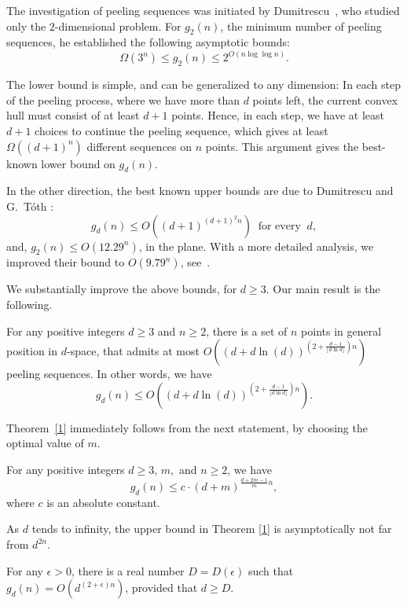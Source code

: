 \documentclass[a4paper,UKenglish,cleveref, autoref, thm-restate]{lipics-v2021}
\begin{document}
The investigation of peeling sequences was initiated by Dumitrescu~\cite{dum1}, who studied only the $2$-dimensional problem. For $g_2(n)$, the minimum number of peeling sequences, he established the following asymptotic bounds:
$$\Omega(3^n)\le g_2(n)\leq 2^{O(n\log{\log{n}})}.$$

 The lower bound is simple, and can be generalized to any dimension: In each step of the peeling process, where we have more than $d$ points left, the current convex hull must consist of at least $d+1$ points. Hence, in each step, we have at least $d+1$ choices to continue the peeling sequence, which gives at least $\Omega((d+1)^n)$ different sequences on $n$ points. This argument gives the best-known lower bound on $g_d(n)$.
 
 In the other direction, the best known upper bounds are due to Dumitrescu and G.~Tóth \cite{Dumitrescu}:  $$g_d(n)\leq O((d+1)^{(d+1)^2n})\;\; \mbox{for every}\;\; d,$$ and, $g_2(n)\leq O(12.29^n)$, in the plane. With a more detailed analysis, we improved their bound to $O(9.79^n)$, see~\cite{Si24}.

We substantially improve the above bounds, for $d\geq 3$. Our main result is the following. 

 \begin{theorem}\label{1}
 For any positive integers $d\geq3$ and $n\geq2$, there is a set of $n$ points in general position in $d$-space, that admits at most $O((d+d\ln{(d)})^{(2+\frac{d-1}{\lfloor d\ln{d}\rfloor})n})$ peeling sequences. In other words, we have
 $$g_d(n)\leq O((d+d\ln{(d)})^{(2+\frac{d-1}{\lfloor d\ln{d}\rfloor})n}).$$
\end{theorem}

Theorem~\ref{1} immediately follows from the next statement, by choosing the optimal value of $m$.

\begin{theorem}\label{0}
     For any positive integers $d\ge 3,\, m,$ and $n\ge 2$, we have $$g_d(n)\leq c\cdot(d+m)^{\frac{d+2m-1}{m}n},$$ where $c$ is an absolute constant.
\end{theorem}
 

As $d$ tends to infinity, the upper bound in Theorem \ref{1} is asymptotically not far from $d^{2n}$.

\begin{corollary} \label{2}
    For any $\epsilon>0$, there is a real number $D=D(\epsilon)$ such that $g_d(n)=O(d^{(2+\epsilon)n})$, provided that $d\ge D$.
\end{corollary}
\end{document}
